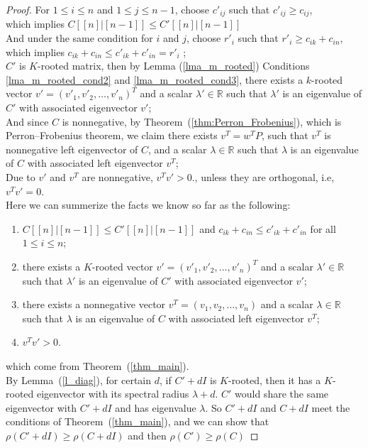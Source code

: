 \documentclass{article}
\theoremstyle{plain}
\theoremstyle{definition}
\begin{document}
\begin{proof}
    For $1\leq i \leq n$ and $1\leq j\leq n-1$, choose $c'_{ij}$ such that $c'_{ij}\geq c_{ij}$, \\
    which implies $C[[n]|[n-1]]\leq C'[[n]|[n-1]]$ \\
    And under the same condition for $i$ and $j$, choose $r'_i$ such that $r'_i\geq c_{ik}+c_{in}$, \\
    which implies $c_{ik}+c_{in}\leq c'_{ik}+c'_{in} = r'_i$ ;\\
    $C'$ is $K$-rooted matrix, then by Lemma (\ref{lma_m_rooted}) Conditions \ref{lma_m_rooted_cond2} and \ref{lma_m_rooted_cond3}, there exists a $k$-rooted vector $v'=(v'_1, v'_2, \ldots, v'_n)^T$ and a scalar $\lambda'\in \mathbb{R}$
    such that $\lambda'$ is an eigenvalue of $C'$ with associated eigenvector $v'$;\\
    And since $C$ is nonnegative, by Theorem~(\ref{thm:Perron_Frobenius}), which is Perron–Frobenius theorem, we claim there exists
    $v^T = w^{T}P$, such that $v^T$ is nonnegative left eigenvector of $C$, and a scalar $\lambda\in \mathbb{R}$ such that $\lambda$ 
    is an eigenvalue of $C$ with associated left eigenvector $v^T$; \\
    Due to $v'$ and $v^T$ are nonnegative, $v^Tv'>0.$, unless they are orthogonal, i.e, $v^Tv'=0$.\\[1ex]
    Here we can summerize the facts we know so far as the following: \\
    \begin{enumerate}[label=(\roman*)]
        \item  $C[[n]|[n-1]]\leq C'[[n]|[n-1]]$ and $c_{ik}+c_{in}\leq c'_{ik}+c'_{in}$ for all $1\leq i\leq n$;
        \item  there exists a $K$-rooted vector $v'=(v'_1, v'_2, \ldots, v'_n)^T$ and a scalar $\lambda'\in \mathbb{R}$
        such that $\lambda'$ is an eigenvalue of $C'$ with associated eigenvector $v'$;
        \item there exists a nonnegative vector $v^T=(v_1, v_2, \ldots, v_n)$ and a scalar $\lambda\in \mathbb{R}$ such that $\lambda$ is an eigenvalue of $C$ with associated left eigenvector $v^T$;
        \item $v^Tv'>0.$
    \end{enumerate}
    which come from Theorem~(\ref{thm_main}).\\
    By Lemma~(\ref{l_diag}), for certain $d$, if $C'+dI$ is $K$-rooted, then it has
    a $K$-rooted eigenvector with its spectral radius $\lambda + d$. $C'$ would share the same
    eigenvector with $C'+dI$ and has eigenvalue $\lambda$. So $C'+dI$ and $C+dI$ meet the
    conditions of Theorem~(\ref{thm_main}), and we can show that $\rho(C' + dI) \geq \rho(C +dI)$ and
    then $\rho(C') \geq \rho(C)$  %
\end{proof}
\end{document}
